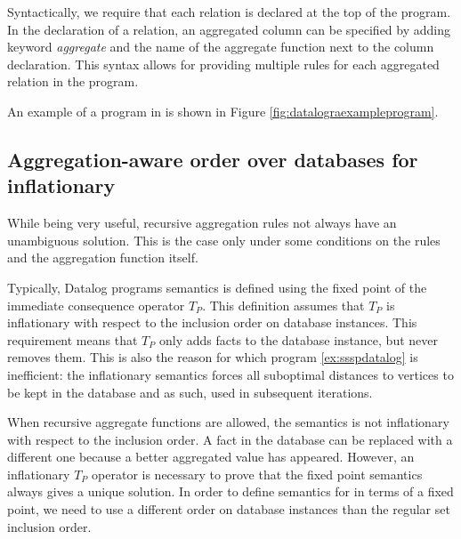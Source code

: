 Syntactically, we require that each \idb relation is declared at the top of the program.
In the declaration of a relation, an aggregated column can be specified by adding keyword \textit{aggregate} and the name of the aggregate function next to the column declaration. This syntax allows for providing multiple rules for each aggregated relation in the program.

An example of a program in \datalogra is shown in Figure \ref{fig:datalograexampleprogram}.

\begin{figure}[!htbp]
\end{figure}


\subsection{Aggregation-aware order over databases for inflationary \datalogra}
While being very useful, recursive aggregation rules not always have an unambiguous solution. This is the case only under some conditions on the rules and the aggregation function itself.

Typically, Datalog programs semantics is defined using the fixed point of the immediate consequence operator $T_P$. This definition assumes that $T_P$ is inflationary with respect to the inclusion order on database instances. This requirement means that $T_P$ only adds facts to the database instance, but never removes them. This is also the reason for which program \ref{ex:ssspdatalog} is inefficient: the inflationary semantics forces all suboptimal distances to vertices to be kept in the database and as such, used in subsequent iterations.

When recursive aggregate functions are allowed, the semantics is not inflationary with respect to the inclusion order. A fact in the database can be replaced with a different one because a better aggregated value has appeared. However, an inflationary $T_P$ operator is necessary to prove that the fixed point semantics always gives a unique solution. In order to define semantics for \datalogra in terms of a fixed point, we need to use a different order on database instances than the regular set inclusion order.

